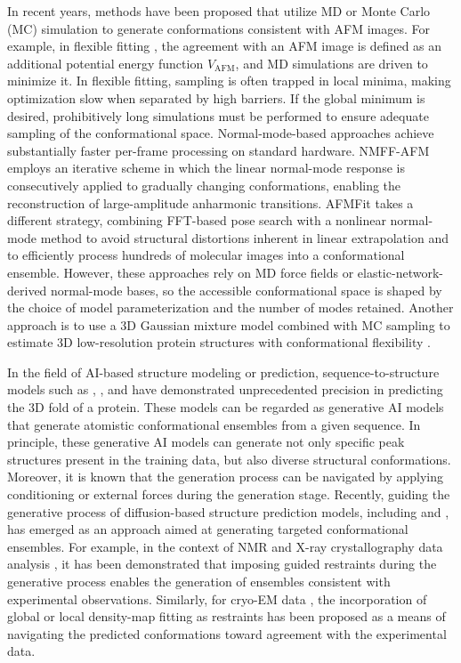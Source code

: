 In recent years, methods have been proposed that utilize MD or Monte Carlo (MC) simulation to generate conformations consistent with AFM images. 
For example, in flexible fitting \cite{Niina2020, ngo2025atomic}, the agreement with an AFM image is defined as an additional potential energy function $V_{\mathrm{AFM}}$, and MD simulations are driven to minimize it. 
In flexible fitting, sampling is often trapped in local minima, making optimization slow when separated by high barriers. 
If the global minimum is desired, prohibitively long simulations must be performed to ensure adequate sampling of the conformational space. 
Normal-mode-based approaches achieve substantially faster per-frame processing on standard hardware. 
NMFF-AFM \cite{Wu2024, amyot_flexible_2025} employs an iterative scheme in which the linear normal-mode response is consecutively applied to gradually changing conformations, enabling the reconstruction of large-amplitude anharmonic transitions. 
AFMFit \cite{Vuillemot2025AFMfit} takes a different strategy, combining FFT-based pose search with a nonlinear normal-mode method to avoid structural distortions inherent in linear extrapolation and to efficiently process hundreds of molecular images into a conformational ensemble.
However, these approaches rely on MD force fields or elastic-network-derived normal-mode bases, so the accessible conformational space is shaped by the choice of model parameterization and the number of modes retained.
Another approach is to use a 3D Gaussian mixture model combined with MC sampling to estimate 3D low-resolution protein structures with conformational flexibility \cite{dasgupta_reconstruction_2020, dasgupta_reconstruction_2021}.

In the field of AI-based structure modeling or prediction, sequence-to-structure models such as \AFii \cite{jumper2021highly, ahdritz2024openfold, mirdita2022colabfold}, \AFiii \cite{Abramson2024}, and \Boltzi \cite{wohlwend2024boltz1} have demonstrated unprecedented precision in predicting the 3D fold of a protein. 
These models can be regarded as generative AI models that generate atomistic conformational ensembles from a given sequence. 
In principle, these generative AI models can generate not only specific peak structures present in the training data, but also diverse structural conformations. 
Moreover, it is known that the generation process can be navigated by applying conditioning or external forces during the generation stage. 
Recently, guiding the generative process of diffusion-based structure prediction models, including \AFiii and \Boltzi, has emerged as an approach aimed at generating targeted conformational ensembles. 
For example, in the context of NMR and X-ray crystallography data analysis \cite{maddipatla2025inverse}, it has been demonstrated that imposing guided restraints during the generative process enables the generation of ensembles consistent with experimental observations. 
Similarly, for cryo-EM data \cite{raghu2025multiscale}, the incorporation of global or local density-map fitting as restraints has been proposed as a means of navigating the predicted conformations toward agreement with the experimental data.

